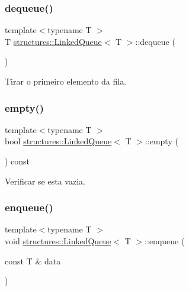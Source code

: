 \subsubsection{\texorpdfstring{dequeue()}{dequeue()}}
{\footnotesize\ttfamily template$<$typename T $>$ \\
T \hyperlink{classstructures_1_1LinkedQueue}{structures\+::\+Linked\+Queue}$<$ T $>$\+::dequeue (\begin{DoxyParamCaption}{ }\end{DoxyParamCaption})}



Tirar o primeiro elemento da fila. 

\mbox{\label{classstructures_1_1LinkedQueue_a24995d6b61ce9e8d05718c966b699c5a}} 
\subsubsection{\texorpdfstring{empty()}{empty()}}
{\footnotesize\ttfamily template$<$typename T $>$ \\
bool \hyperlink{classstructures_1_1LinkedQueue}{structures\+::\+Linked\+Queue}$<$ T $>$\+::empty (\begin{DoxyParamCaption}{ }\end{DoxyParamCaption}) const}



Verificar se esta vazia. 

\mbox{\label{classstructures_1_1LinkedQueue_a6e9d6e444c5d534d01736bb82c34c815}} 
\subsubsection{\texorpdfstring{enqueue()}{enqueue()}}
{\footnotesize\ttfamily template$<$typename T $>$ \\
void \hyperlink{classstructures_1_1LinkedQueue}{structures\+::\+Linked\+Queue}$<$ T $>$\+::enqueue (\begin{DoxyParamCaption}\item[{const T \&}]{data }\end{DoxyParamCaption})}



